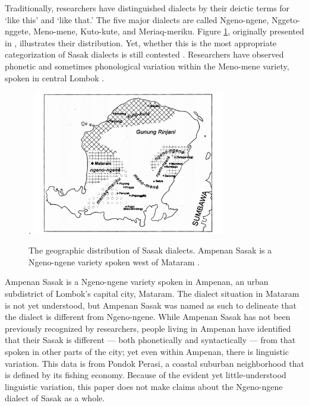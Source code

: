 \documentclass[12pt]{ouparticle}
\begin{document}
Traditionally, researchers have distinguished dialects by their deictic terms for ‘like this’ and ‘like that.’ The five major dialects are called Ngeno-ngene, Nggeto-nggete, Meno-mene, Kuto-kute, and Meriaq-meriku. Figure \ref{fig:sasak_dialects}, originally presented in \citet{jacq1998}, illustrates their distribution. Yet, whether this is the most appropriate categorization of Sasak dialects is still contested \citep{austin2012, jacq1998}. Researchers have observed phonetic and sometimes phonological variation within the Meno-mene variety, spoken in central Lombok \citep{archangeli2018,chahal1998,jacq1998,teeuw1958}.

\begin{figure}[h!]
    \centering
    \caption{The geographic distribution of Sasak dialects. Ampenan Sasak is a Ngeno-ngene variety spoken west of Mataram \citep{jacq1998}.}.
    \includegraphics[width=0.75\textwidth]{Figure1.pdf}
    \label{fig:sasak_dialects}
\end{figure} 


Ampenan Sasak is a Ngeno-ngene variety spoken in Ampenan, an urban subdistrict of Lombok's capital city, Mataram. The dialect situation in Mataram is not yet understood, but Ampenan Sasak was named as such to delineate that the dialect is different from Ngeno-ngene. While Ampenan Sasak has not been previously recognized by researchers, people living in Ampenan have identified that their Sasak is different --- both phonetically and syntactically --- from that spoken in other parts of the city; yet even within Ampenan, there is linguistic variation. This data is from Pondok Perasi, a coastal suburban neighborhood that is defined by its fishing economy. Because of the evident yet little-understood linguistic variation, this paper does not make claims about the Ngeno-ngene dialect of Sasak as a whole.
\end{document}
